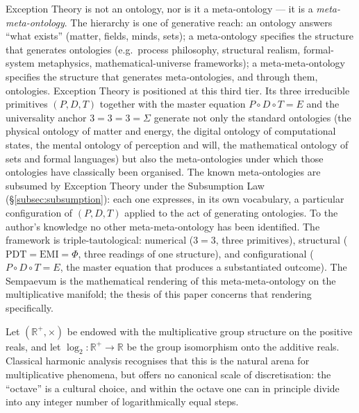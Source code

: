 \documentclass[11pt,a4paper]{article}
\theoremstyle{definition}
\theoremstyle{remark}
\newcommand{\R}{\mathbb{R}}
\begin{document}
Exception Theory is not an ontology, nor is it a meta-ontology --- it is a \emph{meta-meta-ontology}. The hierarchy is one of generative reach: an ontology answers ``what exists'' (matter, fields, minds, sets); a meta-ontology specifies the structure that generates ontologies (e.g.\ process philosophy, structural realism, formal-system metaphysics, mathematical-universe frameworks); a meta-meta-ontology specifies the structure that generates meta-ontologies, and through them, ontologies. Exception Theory is positioned at this third tier. Its three irreducible primitives $(P, D, T)$ together with the master equation $P\circ D\circ T = E$ and the universality anchor $3 = 3 = 3 = \Sigma$ generate not only the standard ontologies (the physical ontology of matter and energy, the digital ontology of computational states, the mental ontology of perception and will, the mathematical ontology of sets and formal languages) but also the meta-ontologies under which those ontologies have classically been organised. The known meta-ontologies are subsumed by Exception Theory under the Subsumption Law (\S\ref{subsec:subsumption}): each one expresses, in its own vocabulary, a particular configuration of $(P, D, T)$ applied to the act of generating ontologies. To the author's knowledge no other meta-meta-ontology has been identified. The framework is triple-tautological: numerical ($3 = 3$, three primitives), structural ($\mathrm{PDT} = \mathrm{EMI} = \Phi$, three readings of one structure), and configurational ($P \circ D \circ T = E$, the master equation that produces a substantiated outcome). The Sempaevum is the mathematical rendering of this meta-meta-ontology on the multiplicative manifold; the thesis of this paper concerns that rendering specifically.

Let $(\R^{+},\times)$ be endowed with the multiplicative group structure on the positive reals, and let $\log_{2}:\R^{+}\to\R$ be the group isomorphism onto the additive reals. Classical harmonic analysis recognises that this is the natural arena for multiplicative phenomena, but offers no canonical scale of discretisation: the ``octave'' is a cultural choice, and within the octave one can in principle divide into any integer number of logarithmically equal steps.
\end{document}
